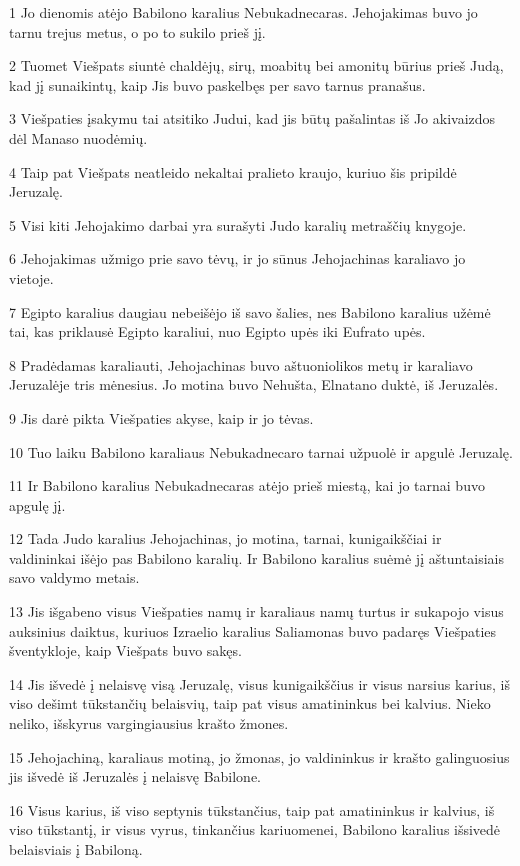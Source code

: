 \par 1 Jo dienomis atėjo Babilono karalius Nebukadnecaras. Jehojakimas buvo jo tarnu trejus metus, o po to sukilo prieš jį. 
\par 2 Tuomet Viešpats siuntė chaldėjų, sirų, moabitų bei amonitų būrius prieš Judą, kad jį sunaikintų, kaip Jis buvo paskelbęs per savo tarnus pranašus. 
\par 3 Viešpaties įsakymu tai atsitiko Judui, kad jis būtų pašalintas iš Jo akivaizdos dėl Manaso nuodėmių. 
\par 4 Taip pat Viešpats neatleido nekaltai pralieto kraujo, kuriuo šis pripildė Jeruzalę. 
\par 5 Visi kiti Jehojakimo darbai yra surašyti Judo karalių metraščių knygoje. 
\par 6 Jehojakimas užmigo prie savo tėvų, ir jo sūnus Jehojachinas karaliavo jo vietoje. 
\par 7 Egipto karalius daugiau nebeišėjo iš savo šalies, nes Babilono karalius užėmė tai, kas priklausė Egipto karaliui, nuo Egipto upės iki Eufrato upės. 
\par 8 Pradėdamas karaliauti, Jehojachinas buvo aštuoniolikos metų ir karaliavo Jeruzalėje tris mėnesius. Jo motina buvo Nehušta, Elnatano duktė, iš Jeruzalės. 
\par 9 Jis darė pikta Viešpaties akyse, kaip ir jo tėvas. 
\par 10 Tuo laiku Babilono karaliaus Nebukadnecaro tarnai užpuolė ir apgulė Jeruzalę. 
\par 11 Ir Babilono karalius Nebukadnecaras atėjo prieš miestą, kai jo tarnai buvo apgulę jį. 
\par 12 Tada Judo karalius Jehojachinas, jo motina, tarnai, kunigaikščiai ir valdininkai išėjo pas Babilono karalių. Ir Babilono karalius suėmė jį aštuntaisiais savo valdymo metais. 
\par 13 Jis išgabeno visus Viešpaties namų ir karaliaus namų turtus ir sukapojo visus auksinius daiktus, kuriuos Izraelio karalius Saliamonas buvo padaręs Viešpaties šventykloje, kaip Viešpats buvo sakęs. 
\par 14 Jis išvedė į nelaisvę visą Jeruzalę, visus kunigaikščius ir visus narsius karius, iš viso dešimt tūkstančių belaisvių, taip pat visus amatininkus bei kalvius. Nieko neliko, išskyrus vargingiausius krašto žmones. 
\par 15 Jehojachiną, karaliaus motiną, jo žmonas, jo valdininkus ir krašto galinguosius jis išvedė iš Jeruzalės į nelaisvę Babilone. 
\par 16 Visus karius, iš viso septynis tūkstančius, taip pat amatininkus ir kalvius, iš viso tūkstantį, ir visus vyrus, tinkančius kariuomenei, Babilono karalius išsivedė belaisviais į Babiloną. 
